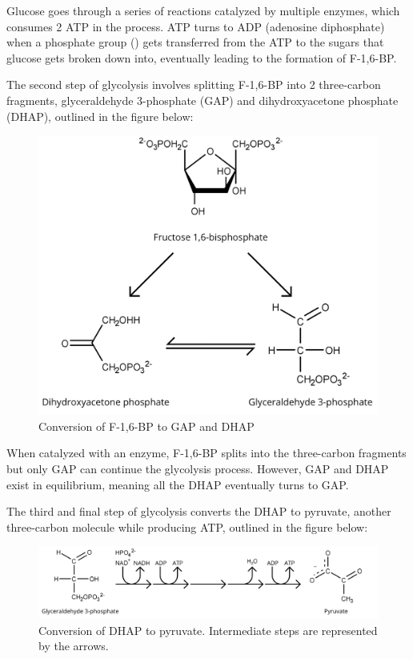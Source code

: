 \documentclass{article}
\begin{document}
Glucose goes through a series of reactions catalyzed by multiple enzymes, which consumes 2 ATP in the process. ATP turns to ADP (adenosine diphosphate) when a phosphate group () gets transferred from the ATP to the sugars that glucose gets broken down into, eventually leading to the formation of F-1,6-BP.

\medskip

The second step of glycolysis involves splitting F-1,6-BP into 2 three-carbon fragments, glyceraldehyde 3-phosphate (GAP) and dihydroxyacetone phosphate (DHAP), outlined in the figure below:
\begin{figure}[H]
    \centering
    \includegraphics[width=0.55\linewidth]{figures/figure_02.png}
    \caption{Conversion of F-1,6-BP to GAP and DHAP}
    \label{fig:figure1}
\end{figure}

\medskip

When catalyzed with an enzyme, F-1,6-BP splits into the three-carbon fragments but only GAP can continue the glycolysis process. However, GAP and DHAP exist in equilibrium, meaning all the DHAP eventually turns to GAP.

\medskip

The third and final step of glycolysis converts the DHAP to pyruvate, another three-carbon molecule while producing ATP, outlined in the figure below:
\begin{figure}[H]
    \centering
    \includegraphics[width=0.886\linewidth]{figures/figure_03.png}
    \caption{Conversion of DHAP to pyruvate. Intermediate steps are represented by the arrows.}
    \label{fig:figure1}
\end{figure}
\end{document}

